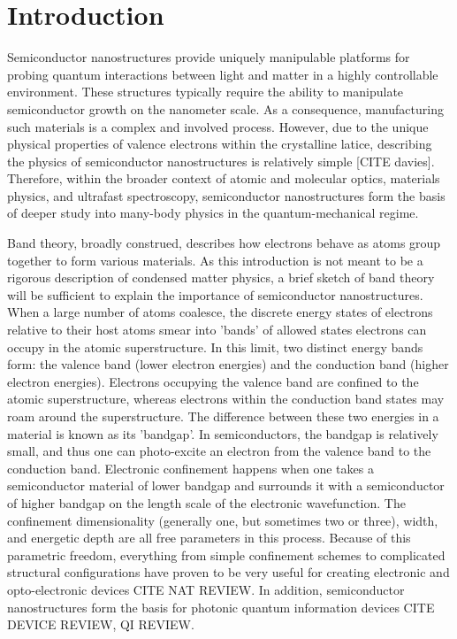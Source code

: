 \chapter{Introduction}

\indent Semiconductor nanostructures provide uniquely manipulable platforms for probing quantum interactions between light and matter in a highly controllable environment. These structures typically require the ability to manipulate semiconductor growth on the nanometer scale. As a consequence, manufacturing such materials is a complex and involved process. However, due to the unique physical properties of valence electrons within the crystalline latice, describing the physics of semiconductor nanostructures is relatively simple [CITE davies]. Therefore, within the broader context of atomic and molecular optics, materials physics, and ultrafast spectroscopy, semiconductor nanostructures form the basis of deeper study into many-body physics in the quantum-mechanical regime.

\indent Band theory, broadly construed, describes how electrons behave as atoms group together to form various materials. As this introduction is not meant to be a rigorous description of condensed matter physics, a brief sketch of 
band theory will be sufficient to explain the importance of semiconductor nanostructures. When a large number of atoms coalesce, the discrete energy states of electrons relative to their host atoms smear into 'bands' of allowed states electrons can occupy in the atomic superstructure. In this limit, two distinct energy bands form: the valence band (lower electron energies) and the conduction band (higher electron energies). Electrons occupying the valence band are confined to the atomic superstructure, whereas electrons within the conduction band states may roam around the superstructure. The difference between these two energies in a material is known as its 'bandgap'. In semiconductors, the bandgap is relatively small, and thus one can photo-excite an electron from the valence band to the conduction band. Electronic confinement happens when one takes a semiconductor material of lower bandgap and surrounds it with a semiconductor of higher bandgap on the length scale of the electronic wavefunction. The confinement dimensionality (generally one, but sometimes two or three), width, and energetic depth are all free parameters in this process. Because of this parametric freedom, everything from simple confinement schemes to complicated structural configurations have proven to be very useful for creating electronic and opto-electronic devices CITE NAT REVIEW. In addition, semiconductor nanostructures form the basis for photonic quantum information devices CITE DEVICE REVIEW, QI REVIEW.

